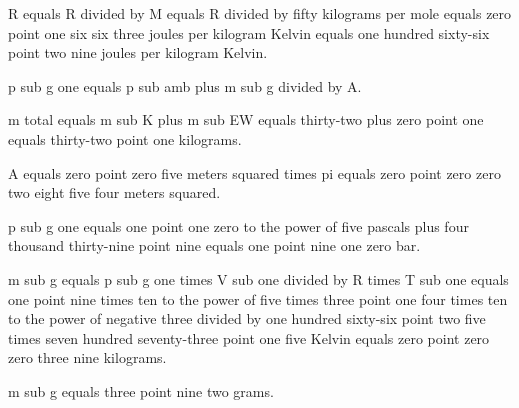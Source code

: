 R equals R divided by M equals R divided by fifty kilograms per mole equals zero point one six six three joules per kilogram Kelvin equals one hundred sixty-six point two nine joules per kilogram Kelvin.  

p sub g one equals p sub amb plus m sub g divided by A.  

m total equals m sub K plus m sub EW equals thirty-two plus zero point one equals thirty-two point one kilograms.  

A equals zero point zero five meters squared times pi equals zero point zero zero two eight five four meters squared.  

p sub g one equals one point one zero to the power of five pascals plus four thousand thirty-nine point nine equals one point nine one zero bar.  

m sub g equals p sub g one times V sub one divided by R times T sub one equals one point nine times ten to the power of five times three point one four times ten to the power of negative three divided by one hundred sixty-six point two five times seven hundred seventy-three point one five Kelvin equals zero point zero zero three nine kilograms.  

m sub g equals three point nine two grams.